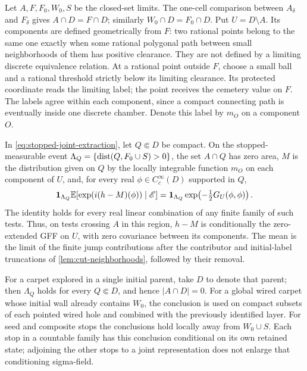 Let \(A,F,F_0,W_0,S\) be the closed-set limits. The one-cell comparison
between \(A_\delta\) and \(F_\delta\) gives \(A\cap D=F\cap D\);
similarly \(W_0\cap D=F_0\cap D\). Put \(U=D\setminus A\).
Its components are defined geometrically from \(F\): two rational
points belong to the same one exactly when some rational polygonal
path between small neighborhoods of them has positive clearance.
They are not defined by a limiting discrete equivalence relation.
At a rational point outside \(F\), choose a small ball and a rational
threshold strictly below its limiting clearance. Its protected coordinate
reads the limiting label; the point receives the cemetery value
on \(F\). The labels agree within each component, since a compact
connecting path is eventually inside one discrete chamber. Denote this
label by \(m_O\) on a component \(O\).

\begin{lemma}
\label{lem:stopped-full-field}
In \eqref{eq:stopped-joint-extraction}, let \(Q\Subset D\) be compact.
On the stopped-measurable event
\(\Lambda_Q=\{\operatorname{dist}(Q,F_0\cup S)>0\}\), the set \(A\cap Q\) has zero
area, \(M\) is the distribution given on \(Q\) by the locally
integrable function \(m_O\) on each component of \(U\), and, for every
real \(\phi\in C_c^\infty(D)\) supported in \(Q\),
\begin{equation}
 \mathbf 1_{\Lambda_Q}
 \mathbb E[\exp(i(h-M)(\phi))\mid\mathscr E]
 =\mathbf 1_{\Lambda_Q}
       \exp\!\left(-\tfrac12G_U(\phi,\phi)\right).
 \label{eq:stopped-full-characteristic}
\end{equation}
The identity holds for every real linear combination of any finite
family of such tests. Thus, on tests crossing \(A\) in this region,
\(h-M\) is conditionally the zero-extended GFF on \(U\), with zero
covariance between its components. The mean is the limit of the
finite jump contributions after the contributor and initial-label
truncations of \cref{lem:cut-neighborhoods}, followed by their removal.

For a carpet explored in a single initial parent, take \(D\) to denote
that parent; then \(\Lambda_Q\) holds for every \(Q\Subset D\), and hence
\(|A\cap D|=0\). For a global wired carpet whose initial wall already
contains \(W_0\), the conclusion is used on compact subsets of each
pointed wired hole and combined with the previously identified layer.
For seed and composite stops the conclusions hold locally away from
\(W_0\cup S\). Each stop in a countable family has
this conclusion conditional on its own retained state; adjoining the
other stops to a joint representation does not enlarge that conditioning
sigma-field.
\end{lemma}

